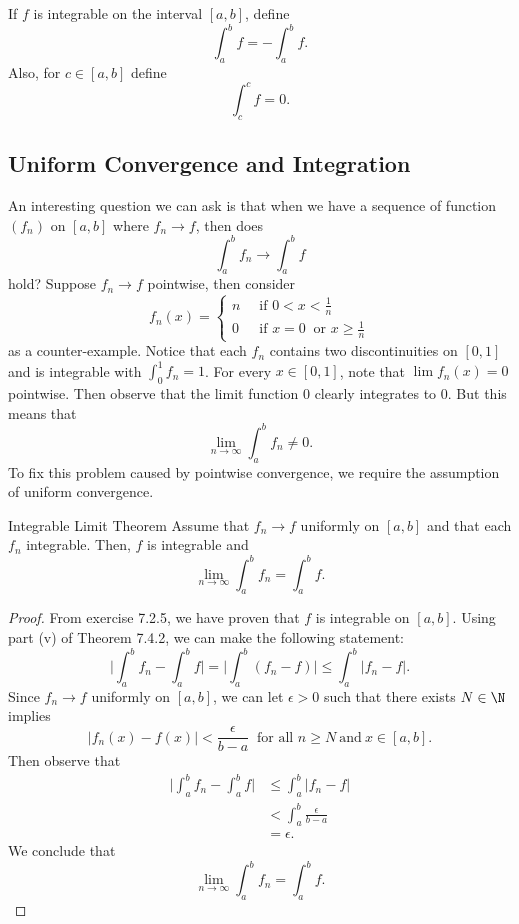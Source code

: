 \begin{definition}
	If \( f  \) is integrable on the interval \( [a,b]  \), define 
	\[  \int_{ a }^{ b } f = - \int_{ a }^{b  } f. \]
	Also, for \( c \in [a,b]  \) define 
	\[  \int_{ c }^{ c } f = 0. \]
\end{definition}

\subsection{Uniform Convergence and Integration}

An interesting question we can ask is that when we have a sequence of function \( (f_{n}) \) on \( [a,b]  \) where \( f_{n} \to f  \), then does 
\[  \int_{ a }^{ b } f_{n} \to \int_{ a }^{ b } f  \]
hold? Suppose \( f_{n} \to f  \) pointwise, then consider 
\[  f_{n}(x) = 
\begin{cases}
	n \ &\text{ if } 0 < x < \frac{ 1 }{ n } \\
	0 \ &\text{ if } x = 0 \ \text{ or } x \geq \frac{ 1 }{ n }
\end{cases} \]
as a counter-example. Notice that each \( f_{n} \) contains two discontinuities on \( [0,1] \) and is integrable with \( \int_{ 0 }^{ 1 } f_{n} = 1  \). For every \( x \in [0,1] \), note that \( \lim f_{n}(x) = 0  \) pointwise.  Then observe that the limit function \( 0  \) clearly integrates to \( 0 \). But this means that 
\[  \lim_{ n \to \infty  }  \int_{ a }^{ b } f_{n} \neq 0. \]
To fix this problem caused by pointwise convergence, we require the assumption of uniform convergence. 


\begin{theorem}{Integrable Limit Theorem}{}
	Assume that \( f_{n} \to f  \) uniformly on \( [a,b]  \) and that each \( f_{n}  \) integrable. Then, \( f \) is integrable and 
	\[  \lim_{ n \to \infty  }  \int_{ a }^{ b } f_{n} = \int_{ a }^{ b } f. \]
	\end{theorem}
\begin{proof} From exercise 7.2.5, we have proven that \( f  \) is integrable on \( [a,b] \). 
	Using part (v) of Theorem 7.4.2, we can make the following statement:
	\[ \Big| \int_{ a }^{ b } f_{n} - \int_{ a }^{ b } f  \Big| = \Big| \int_{ a }^{ b }  (f_{n} - f )  \Big| \leq \int_{ a }^{ b }  | f_{n} -f  |.   \]
	Since \( f_{n} \to f  \) uniformly on \( [a,b] \), we can let \( \epsilon > 0  \) such that there exists \( N \in \N \) implies 
	\[  | f_{n}(x) - f(x)  | < \frac{ \epsilon  }{ b -a  }  \ \text{ for all } n \geq N \ \text{and} \ x \in [a,b].\] Then observe that 
	\begin{align*}
	    \Big| \int_{ a }^{ b } f_{n} - \int_{ a }^{ b } f  \Big| &\leq \int_{ a }^{ b } | f_{n} - f  |   \\
																 &< \int_{ a }^{ b }  \frac{ \epsilon  }{ b -a  } \\
																 &= \epsilon.
	\end{align*}
	We conclude that 
	\[  \lim_{ n \to \infty  }  \int_{ a }^{ b } f_{n} = \int_{ a }^{ b } f. \]
\end{proof}


